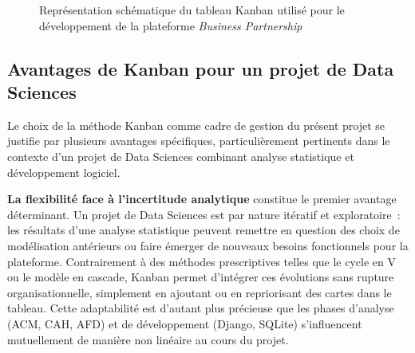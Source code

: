 \begin{figure}[H]
	\centering
	\caption{Représentation schématique du tableau Kanban utilisé pour
		le développement de la plateforme \textit{Business Partnership}}
	\label{fig:kanban_board}
\end{figure}
\subsection{Avantages de Kanban pour un projet de Data Sciences}
\label{subsec:kanban_avantages}

Le choix de la méthode Kanban comme cadre de gestion du présent
projet se justifie par plusieurs avantages spécifiques, particulièrement
pertinents dans le contexte d'un projet de Data Sciences combinant
analyse statistique et développement logiciel.

\textbf{La flexibilité face à l'incertitude analytique} constitue
le premier avantage déterminant. Un projet de Data Sciences est par
nature itératif et exploratoire~: les résultats d'une analyse
statistique peuvent remettre en question des choix de modélisation
antérieurs ou faire émerger de nouveaux besoins fonctionnels pour
la plateforme. Contrairement à des méthodes prescriptives telles
que le cycle en V ou le modèle en cascade, Kanban permet d'intégrer
ces évolutions sans rupture organisationnelle, simplement en ajoutant
ou en repriorisant des cartes dans le tableau. Cette adaptabilité
est d'autant plus précieuse que les phases d'analyse (ACM, CAH, AFD)
et de développement (Django, SQLite) s'influencent mutuellement de
manière non linéaire au cours du projet.

